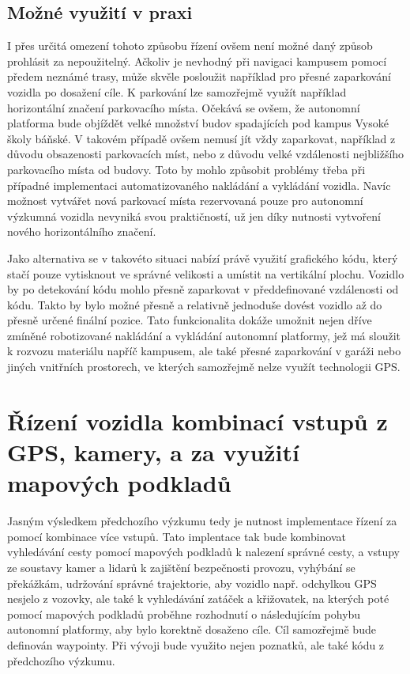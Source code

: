 \documentclass[czech, bachelor]{diploma}
\begin{document}
\subsection{Možné využití v praxi}

I přes určitá omezení tohoto způsobu řízení ovšem není možné daný způsob prohlásit za nepoužitelný. Ačkoliv je nevhodný
při navigaci kampusem pomocí předem neznámé trasy, může skvěle posloužit například pro přesné zaparkování vozidla po dosažení
cíle. K parkování lze samozřejmě využít například horizontální značení parkovacího místa. Očekává se ovšem, že autonomní platforma
bude objíždět velké množství budov spadajících pod kampus Vysoké školy báňské. V takovém případě ovšem nemusí jít vždy zaparkovat,
například z důvodu obsazenosti parkovacích míst, nebo z důvodu velké vzdálenosti nejbližšího parkovacího místa od budovy. Toto by
mohlo způsobit problémy třeba při případné implementaci automatizovaného nakládání a vykládání vozidla. Navíc možnost vytvářet
nová parkovací místa rezervovaná pouze pro autonomní výzkumná vozidla nevyniká svou praktičností, už jen díky nutnosti vytvoření
nového horizontálního značení.

Jako alternativa se v takovéto situaci nabízí právě využití grafického kódu, který stačí pouze vytisknout ve správné velikosti
a umístit na vertikální plochu. Vozidlo by po detekování kódu mohlo přesně zaparkovat v předdefinované vzdálenosti od kódu. Takto
by bylo možné přesně a relativně jednoduše dovést vozidlo až do přesně určené finální pozice. Tato funkcionalita dokáže umožnit
nejen dříve zmíněné robotizované nakládání a vykládání autonomní platformy, jež má sloužit k rozvozu materiálu napříč kampusem,
ale také přesné zaparkování v garáži nebo jiných vnitřních prostorech, ve kterých samozřejmě nelze využít technologii GPS.

\section{Řízení vozidla kombinací vstupů z GPS, kamery, a za využití mapových podkladů} \label{combination-of-driving-inputs}

Jasným výsledkem předchozího výzkumu tedy je nutnost implementace řízení za pomocí kombinace více vstupů. Tato implentace tak bude
kombinovat vyhledávání cesty pomocí mapových podkladů k nalezení správné cesty, a vstupy ze soustavy kamer a lidarů k zajištění
bezpečnosti provozu, vyhýbání se překážkám, udržování správné trajektorie, aby vozidlo např. odchylkou GPS nesjelo z vozovky,
ale také k vyhledávání zatáček a křižovatek, na kterých poté pomocí mapových podkladů proběhne rozhodnutí o následujícím pohybu
autonomní platformy, aby bylo korektně dosaženo cíle. Cíl samozřejmě bude definován waypointy. Při vývoji bude využito nejen
poznatků, ale také kódu z předchozího výzkumu.
\end{document}

